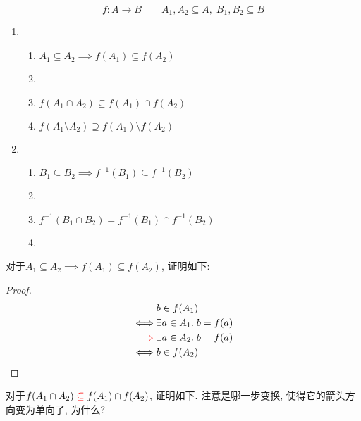 \begin{theorem}
  \[
    f: A \to B \qquad
    {A_1, A_2 \subseteq A,\; B_1, B_2 \subseteq B}
  \]

  \begin{enumerate}
    \item {}
      \begin{enumerate}
        \item $A_1 \subseteq A_2 \implies f(A_1) \subseteq f(A_2)$
        \item {}
        \item $f(A_1 \cap A_2) \subseteq f(A_1) \cap f(A_2)$
        \item $f(A_1 \setminus A_2) \supseteq f(A_1) \setminus f(A_2)$
      \end{enumerate}
    \item {}\begin{enumerate}
      \item $B_1 \subseteq B_2 \implies f^{-1}(B_1) \subseteq f^{-1}(B_2)$
      \item {}
      \item $f^{-1}(B_1 \cap B_2) = f^{-1}(B_1) \cap f^{-1}(B_2)$
      \item {}
    \end{enumerate}
  \end{enumerate}
\end{theorem}

对于$A_1 \subseteq A_2 \implies f(A_1) \subseteq f(A_2)$, 证明如下: 

\begin{proof}
  \setcounter{equation}{0}
  \begin{align*}
    &b \in f(A_{1}) \\
    \iff & \exists a \in A_{1}.\; b = f(a) \\
    \textcolor{red}{\implies} & \exists a \in A_{2}.\; b = f(a) \\
    \iff & b \in f(A_{2})
  \end{align*}
\end{proof}

对于$f(A_1 \cap A_2) \textcolor{red}{\;\subseteq\;} f(A_1) \cap f(A_2)$, 证明如下. 注意是哪一步变换, 使得它的箭头方向变为单向了, 为什么? 


